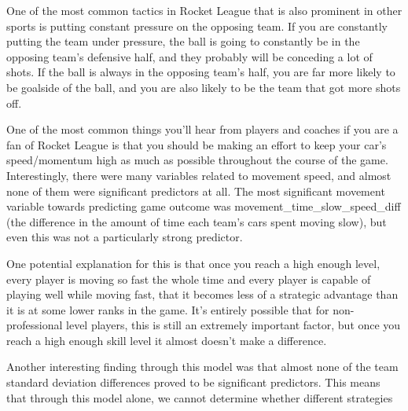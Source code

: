 \documentclass[
  letterpaper,
  DIV=11,
  numbers=noendperiod]{scrartcl}
\begin{document}
One of the most common tactics in Rocket League that is also prominent
in other sports is putting constant pressure on the opposing team. If
you are constantly putting the team under pressure, the ball is going to
constantly be in the opposing team's defensive half, and they probably
will be conceding a lot of shots. If the ball is always in the opposing
team's half, you are far more likely to be goalside of the ball, and you
are also likely to be the team that got more shots off.

One of the most common things you'll hear from players and coaches if
you are a fan of Rocket League is that you should be making an effort to
keep your car's speed/momentum high as much as possible throughout the
course of the game. Interestingly, there were many variables related to
movement speed, and almost none of them were significant predictors at
all. The most significant movement variable towards predicting game
outcome was movement\_time\_slow\_speed\_diff (the difference in the
amount of time each team's cars spent moving slow), but even this was
not a particularly strong predictor.

One potential explanation for this is that once you reach a high enough
level, every player is moving so fast the whole time and every player is
capable of playing well while moving fast, that it becomes less of a
strategic advantage than it is at some lower ranks in the game. It's
entirely possible that for non-professional level players, this is still
an extremely important factor, but once you reach a high enough skill
level it almost doesn't make a difference.

Another interesting finding through this model was that almost none of
the team standard deviation differences proved to be significant
predictors. This means that through this model alone, we cannot
determine whether different strategies
\end{document}
